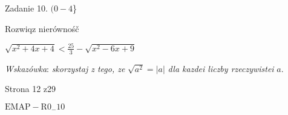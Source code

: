 \documentclass[a4paper,12pt]{article}
\begin{document}
Zadanie 10. $(0-4$\}

Rozwiqz nierównośč

$\displaystyle \sqrt{x^{2}+4x+4}<\frac{25}{3}-\sqrt{x^{2}-6x+9}$

{\it Wskazówka}: {\it skorzystaj z tego, ze} $\sqrt{a^{2}}=|a|$ {\it dla kazdei liczby rzeczywistei} $a.$

Strona 12 z29

$\mathrm{E}\mathrm{M}\mathrm{A}\mathrm{P}-\mathrm{R}0_{-}10$
\end{document}
